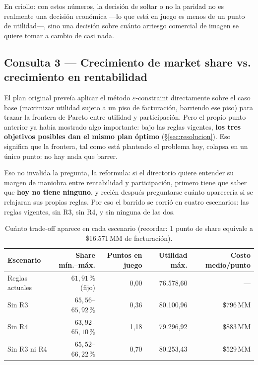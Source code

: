 \documentclass[10pt,a4paper]{article}
\begin{document}
En criollo: con estos números, la decisión de soltar o no la paridad no es
realmente una decisión económica —lo que está en juego es menos de un punto de
utilidad—, sino una decisión sobre cuánto arriesgo comercial de imagen se
quiere tomar a cambio de casi nada.

\subsection{Consulta 3 — Crecimiento de market share vs. crecimiento en rentabilidad}
\label{sec:consulta3}

El plan original preveía aplicar el método $\varepsilon$-constraint
directamente sobre el caso base (maximizar utilidad sujeto a un piso de
facturación, barriendo ese piso) para trazar la frontera de Pareto entre
utilidad y participación. Pero el propio punto anterior ya había mostrado algo
importante: bajo las reglas vigentes, \textbf{los tres objetivos posibles dan
el mismo plan óptimo} (\S\ref{sec:resolucion}). Eso significa que la frontera,
tal como está planteado el problema hoy, colapsa en un único punto: no hay
nada que barrer.

Eso no invalida la pregunta, la reformula: si el directorio quiere entender su
margen de maniobra entre rentabilidad y participación, primero tiene que saber
que \textbf{hoy no tiene ninguno}, y recién después preguntarse cuánto
aparecería si se relajaran sus propias reglas. Por eso el barrido se corrió en
cuatro escenarios: las reglas vigentes, sin R3, sin R4, y sin ninguna de las
dos.

\begin{table}[htbp]
\centering\small
\caption{Cuánto trade-off aparece en cada escenario (recordar: 1 punto de
share equivale a \$16.571\,MM de facturación).}
\begin{tabular}{lrrrr}
\toprule
Escenario & Share mín.--máx. & Puntos en juego & Utilidad máx. & Costo medio/punto \\
\midrule
Reglas actuales   & $61{,}91\,\%$ (fijo)     & 0{,}00 & 76.578,60 & — \\
Sin R3            & $65{,}56$--$65{,}92\,\%$ & 0{,}36 & 80.100,96 & \$796\,MM \\
Sin R4            & $63{,}92$--$65{,}10\,\%$ & 1{,}18 & 79.296,92 & \$883\,MM \\
Sin R3 ni R4      & $65{,}52$--$66{,}22\,\%$ & 0{,}70 & 80.253,43 & \$529\,MM \\
\bottomrule
\end{tabular}
\end{table}
\end{document}

